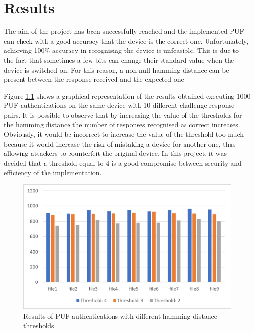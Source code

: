 \chapter{Results}

The aim of the project has been successfully reached and the implemented PUF can check with a good accuracy that the device is the correct one.
Unfortunately, achieving 100\% accuracy in recognising the device is unfeasible. This is due to the fact that sometimes a few bits can change their standard value when the device is switched on.
For this reason, a non-null hamming distance can be present between the response received and the expected one.

Figure \ref{fig:Results} shows a graphical representation of the results obtained executing 1000 PUF authentications on the same device with 10 different challenge-response pairs.
It is possible to observe that by increasing the value of the thresholds for the hamming distance the number of responses recognised as correct increases.
Obviously, it would be incorrect to increase the value of the threshold too much because it would increase the risk of mistaking a device for another one, thus allowing attackers to counterfeit the original device. In this project, it was decided that a threshold equal to 4 is a good compromise between security and efficiency of the implementation.

\begin{figure}[tb]
\includegraphics[width=\textwidth]{images/results.png}
\caption{Results of PUF authentications with different hamming distance thresholds. }
\label{fig:Results} %
\end{figure}


